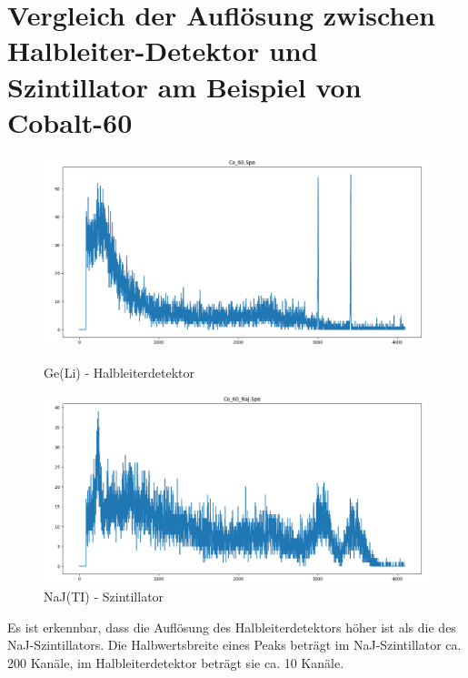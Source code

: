 \documentclass[12pt,german]{article}
\begin{document}
    \section[Vergleich der Auflösung zwischen Halbleiter-Detektor und Szintillator]{Vergleich der Auflösung zwischen Halbleiter-Detektor und Szintillator am Beispiel von Cobalt-60}
    \begin{figure}[H]
        \begin{minipage}[t]{0.475\textwidth}
            \centering
            \includegraphics[width=1\textwidth]{pics/Co_60.png}
            \caption{Ge(Li) - Halbleiterdetektor}
        \end{minipage}
        \hfill
        \begin{minipage}[t]{0.475\textwidth}
            \centering
            \includegraphics[width=1\textwidth]{pics/Co_60_NaJ.png}
            \caption{NaJ(TI) - Szintillator}
        \end{minipage}
    \end{figure}
    Es ist erkennbar, dass die Auflösung des Halbleiterdetektors höher ist als die des NaJ-Szintillators.
    Die Halbwertsbreite eines Peaks beträgt im NaJ-Szintillator ca. 200 Kanäle, im Halbleiterdetektor beträgt sie ca. 10 Kanäle.
\end{document}

